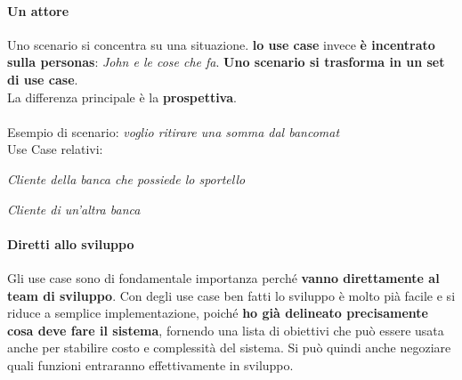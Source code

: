 \documentclass[10pt]{article}
\begin{document}
\paragraph{Un attore} Uno scenario si concentra su una situazione. \textbf{lo use case} invece \textbf{è incentrato sulla personas}: \textit{John e le cose che fa}. \textbf{Uno scenario si trasforma in un set di use case}.\\
La differenza principale è la \textbf{prospettiva}.\\\\
Esempio di scenario: \textit{voglio ritirare una somma dal bancomat}\\
Use Case relativi: \begin{list}{-}{}
\item \textit{Cliente della banca che possiede lo sportello}
\item \textit{Cliente di un'altra banca}
\end{list}
\paragraph{Diretti allo sviluppo} Gli use case sono di fondamentale importanza perché \textbf{vanno direttamente al team di sviluppo}. Con degli use case ben fatti lo sviluppo è molto pià facile e si riduce a semplice implementazione, poiché \textbf{ho già delineato precisamente cosa deve fare il sistema}, fornendo una lista di obiettivi che può essere usata anche per stabilire costo e complessità del sistema. Si può quindi anche negoziare quali funzioni entraranno effettivamente in sviluppo.
\end{document}
